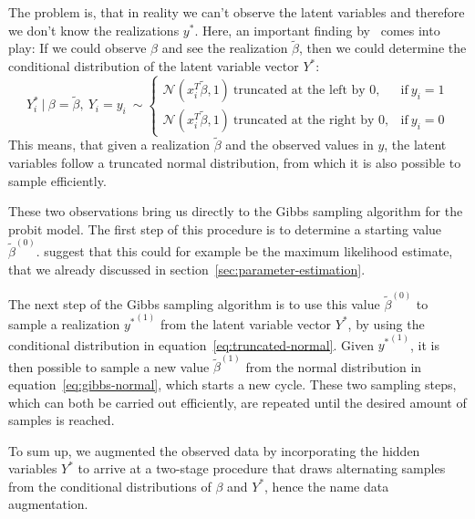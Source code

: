 The problem is, that in reality we can't observe the latent variables and
therefore we don't know the realizations $y^\ast$.
Here, an important finding by~\cite{gibbs-probit-albert-chib} comes
into play: If we could observe $\beta$ and see the realization
$\tilde\beta$, then we could determine the conditional distribution
of the latent variable vector $Y^\ast$:
\begin{equation}
    \label{eq:truncated-normal}
    Y_i^\ast\ |\ \beta = \tilde\beta,\ Y_i=y_i\ \sim
    \begin{cases}
        \mathcal{N}(x_i^T\tilde\beta, 1)\ \text{truncated at the left by 0},  & \text{if}\ y_i = 1 \\
        \mathcal{N}(x_i^T\tilde\beta, 1)\ \text{truncated at the right by 0}, & \text{if}\ y_i = 0
    \end{cases}
\end{equation}
This means, that given a realization $\tilde\beta$ and the observed
values in $y$, the latent variables
follow a truncated normal distribution, from which it is also
possible to sample efficiently.

These two observations bring us directly to the Gibbs sampling algorithm
for the probit model. The first step of this procedure is
to determine a starting value $\tilde\beta^{(0)}$.
\cite{gibbs-probit-albert-chib} suggest that this could for example
be the maximum likelihood estimate, that we already discussed in
section~\ref{sec:parameter-estimation}.

The next step of the Gibbs sampling algorithm is to use this value
$\tilde\beta^{(0)}$ to sample a realization ${y^\ast}^{(1)}$ from the latent
variable vector $Y^\ast$, by using the conditional distribution
in equation~\ref{eq:truncated-normal}. Given ${y^\ast}^{(1)}$,
it is then possible to sample a new value $\tilde\beta^{(1)}$ from
the normal distribution in equation~\ref{eq:gibbs-normal},
which starts a new cycle. These two sampling steps, which can
both be carried out efficiently, are repeated until
the desired amount of samples is reached.

To sum up, we augmented the observed data by incorporating the
hidden variables $Y^\ast$ to arrive at a two-stage procedure
that draws alternating samples from the conditional distributions
of $\beta$ and $Y^\ast$, hence the name data augmentation.

\newpage